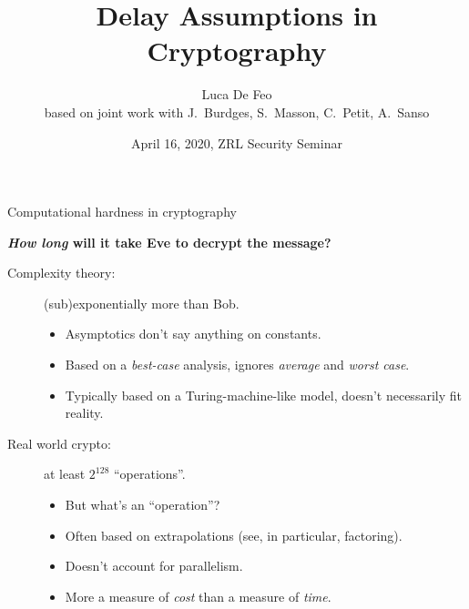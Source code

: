 \documentclass[aspectratio=169]{beamer}
\title{Delay Assumptions in Cryptography}
\author[Luca De Feo]{
  Luca De Feo\\[1em]
  based on joint work with J.~Burdges, S.~Masson, C.~Petit, A.~Sanso}
\date{April 16, 2020, ZRL Security Seminar}
\institute{IBM Research Zürich}
\begin{document}
\frame[plain]{\titlepage}


\begin{frame}{Computational hardness in cryptography}
  \begin{center}
    \framebox{\textcolor{gray}{boring picture of Alice, Bob and Eve goes here}}
  \end{center}

  \medskip
  
  \textbf{\emph{How long} will it take Eve to decrypt the message?}
  \smallskip
  \begin{description}
  \item[Complexity theory:] (sub)exponentially more than Bob.
    \begin{itemize}
    \item Asymptotics don't say anything on constants.
    \item Based on a \emph{best-case} analysis, ignores \emph{average}
      and \emph{worst case}.
    \item Typically based on a Turing-machine-like model, doesn't
      necessarily fit reality.
    \end{itemize}
  \item[Real world crypto:] at least $2^{128}$ ``operations''.
    \begin{itemize}
    \item But what's an ``operation''?
    \item Often based on extrapolations (see, in particular, factoring).
    \item Doesn't account for parallelism.
    \item More a measure of \emph{cost} than a measure of \emph{time}.
    \end{itemize}
  \end{description}
\end{frame}

\end{document}
